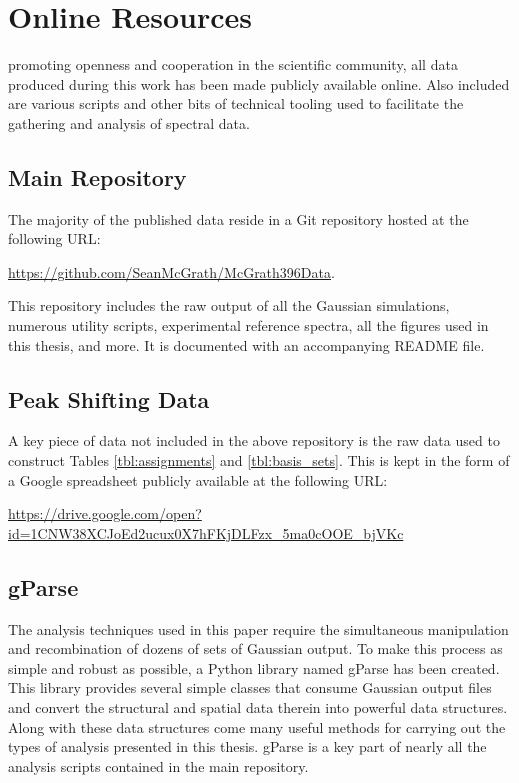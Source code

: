 \chapter{Online Resources}

 promoting openness and cooperation in the scientific community, all data produced during this work has been made publicly available online. Also included are various scripts and other bits of technical tooling used to facilitate the gathering and analysis of spectral data.

\section{Main Repository}

The majority of the published data reside in a Git repository hosted at the following URL:

\bigskip
\noindent\href{https://github.com/SeanMcGrath/McGrath396Data}{https://github.com/SeanMcGrath/McGrath396Data}.

\bigskip
\noindent This repository includes the raw output of all the Gaussian simulations, numerous utility scripts, experimental reference spectra, all the figures used in this thesis, and more. It is documented with an accompanying README file.

\section{Peak Shifting Data}

A key piece of data not included in the above repository is the raw data used to construct Tables \ref{tbl:assignments} and \ref{tbl:basis_sets}. This is kept in the form of a Google spreadsheet publicly available at the following URL:

\noindent\href{https://drive.google.com/open?id=1CNW38XCJoEd2ucux0X7hFKjDLFzx_5ma0cOOE_bjVKc}{https://drive.google.com/open?id=1CNW38XCJoEd2ucux0X7hFKjDLFzx\_5ma0cOOE\_bjVKc}

\section{gParse}

The analysis techniques used in this paper require the simultaneous manipulation and recombination of dozens of sets of Gaussian output. To make this process as simple and robust as possible, a Python library named gParse has been created. This library provides several simple classes that consume Gaussian output files and convert the structural and spatial data therein into powerful data structures. Along with these data structures come many useful methods for carrying out the types of analysis presented in this thesis. gParse is a key part of nearly all the analysis scripts contained in the main repository.

